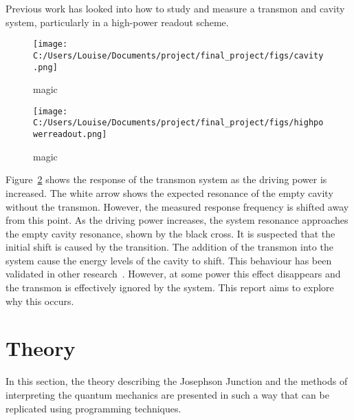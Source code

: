 \documentclass[11pt]{article}
\begin{document}
Previous work has looked into how to study and measure a transmon and cavity system, particularly in a high-power readout scheme.
\begin{figure}[ht]
\centering
\texttt{[image: C:/Users/Louise/Documents/project/final\_project/figs/cavity.png]}
\caption{magic}
\label{fig:picture2}
\end{figure}
\begin{figure}[ht]
\centering
\texttt{[image: C:/Users/Louise/Documents/project/final\_project/figs/highpowerreadout.png]}
\caption{magic}
\label{fig:picture3}
\end{figure}
Figure~\ref{fig:picture3} shows the response of the transmon system as the driving power is increased. The white arrow shows the expected resonance of the empty cavity without the transmon. However, the measured response frequency is shifted away from this point. As the driving power increases, the system resonance approaches the empty cavity resonance, shown by the black cross. It is suspected that the initial shift is caused by the transition. The addition of the transmon into the system cause the energy levels of the cavity to shift. This behaviour has been validated in other research~\cite{bishopResponseStronglyDriven2010,paikObservationHighCoherence2011,elliottApplicationsFokkerPlanckEquation2016}. However, at some power this effect disappears and the transmon is effectively ignored by the system. This report aims to explore why this occurs.


\section{Theory}
In this section, the theory describing the Josephson Junction and the methods of interpreting the quantum mechanics are presented in such a way that can be replicated using programming techniques.
\end{document}
